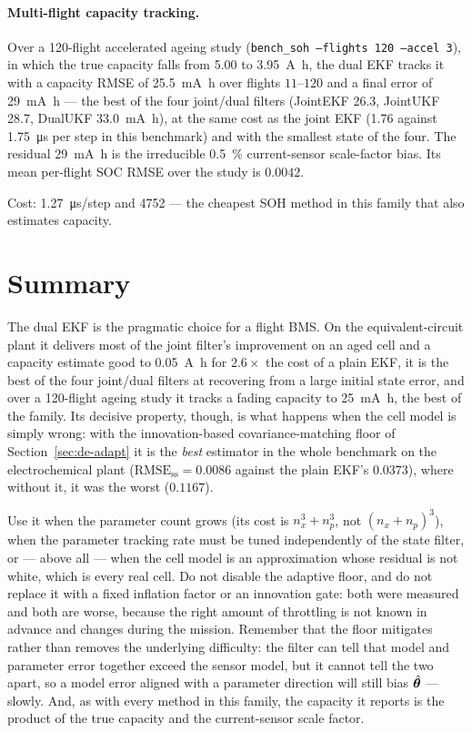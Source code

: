 \paragraph{Multi-flight capacity tracking.}  Over a 120-flight accelerated ageing study
(\texttt{bench\_soh --flights 120 --accel 3}), in which the true capacity falls from \SI{5.00}{} to
\SI{3.95}{\ampere\hour}, the dual EKF tracks it with a capacity RMSE of \SI{25.5}{\milli\ampere\hour}
over flights $11$--$120$ and a final error of \SI{+29}{\milli\ampere\hour} --- the best of the four
joint/dual filters (JointEKF \SI{26.3}{}, JointUKF \SI{28.7}{}, DualUKF \SI{33.0}{\milli\ampere\hour}),
at the same cost as the joint EKF (\SI{1.76}{} against \SI{1.75}{\micro\second} per step in
this benchmark) and with the smallest state of the four.  The residual \SI{+29}{\milli\ampere\hour} is the irreducible
\SI{+0.5}{\percent} current-sensor scale-factor bias.  Its mean per-flight SOC RMSE over the study is
$0.0042$.

Cost: \SI{1.27}{\micro\second}/step and \SI{4752}{\byte} --- the cheapest SOH method in this family
that also estimates capacity.

\section{Summary}
The dual EKF is the pragmatic choice for a flight BMS.  On the equivalent-circuit plant it delivers
most of the joint filter's improvement on an aged cell and a capacity estimate good to
\SI{0.05}{\ampere\hour} for $2.6\times$ the cost of a plain EKF, it is the best of the four
joint/dual filters at recovering from a large initial state error, and over a 120-flight ageing study
it tracks a fading capacity to \SI{25}{\milli\ampere\hour}, the best of the family.  Its decisive
property, though, is what happens when the cell model is simply wrong: with the innovation-based
covariance-matching floor of Section~\ref{sec:de-adapt} it is the \emph{best} estimator in the whole
benchmark on the electrochemical plant ($\text{RMSE}_\text{ss}=0.0086$ against the plain EKF's
$0.0373$), where without it, it was the worst ($0.1167$).

Use it when the parameter count grows (its cost is $n_x^3+n_p^3$, not $(n_x+n_p)^3$), when the
parameter tracking rate must be tuned independently of the state filter, or --- above all --- when
the cell model is an approximation whose residual is not white, which is every real cell.  Do not
disable the adaptive floor, and do not replace it with a fixed inflation factor or an innovation
gate: both were measured and both are worse, because the right amount of throttling is not known in
advance and changes during the mission.  Remember that the floor mitigates rather than removes the
underlying difficulty: the filter can tell that model and parameter error together exceed the sensor
model, but it cannot tell the two apart, so a model error aligned with a parameter direction will
still bias $\hat{\bm{\theta}}$ --- slowly.  And, as with every method in this family, the capacity it
reports is the product of the true capacity and the current-sensor scale factor.
